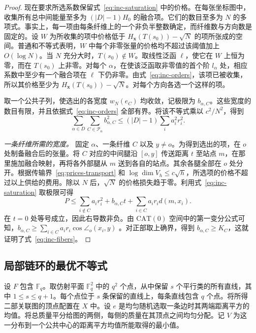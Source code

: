 \begin{proof}
现在要求所选系数保留式~\eqref{eq:inc-saturation} 中的价格。在每张坐标图中，收集所有总中间能量至多为 $(|D|-1)H_0$ 的融合项。它们的数目至多为 $N$ 的多项式。事实上，每一项由每条纤维上的一个非负半整数确定，而纤维数与方向数是固定的。设 $W$ 为所收集的项中价格低于 $H_{\mathbf x}(T(s_0))-\sqrt N$ 的项所张成的空间。普通和不等式表明，$W$ 中每个非零张量的价格均不超过该阈值加上 $O(\log N)$。当 $N$ 充分大时，$T(s_0)\notin W$。取线性泛函 $\ell$，使它在 $W$ 上恒为零，而在 $T(s_0)$ 上非零。对每个 $\alpha$，在使该泛函取非零值的首个阶 $l_\alpha$ 处，相应系数中至少有一个融合项在 $\ell$ 下仍非零。由式~\eqref{eq:inc-orders}，该项已被收集，所以其价格至少为 $H_{\mathbf x}(T(s_0))-\sqrt N$。对每个方向各选一个这样的项。

取一个公共子列，使选出的各宽度 $w_N(e_C)$ 均收敛，记极限为 $b_{\alpha,C}$。这些宽度的数目有限，并且依据式~\eqref{eq:inc-orders} 全部有界。将该不等式乘以 $c^2/N^2$，得到
\[
 \sum_{\alpha\in D}\sum_{C\in\mathcal P_\alpha}b_{\alpha,C}^2
                  \le (|D|-1)\sum_i a_i^2 r_i^2 .
\]

\emph{一条纤维所需的宽度。}
固定 $\alpha$、一条纤维 $C$ 以及 $y\ne o$。为得到选出的项，在 $o$ 处制备融合后的张量。将 $C$ 对应的中间腿沿 $[o,y]$ 传送距离 $t$ 至站点 $m$，在那里施加融合映射，再将各外部腿从 $m$ 送到各自的站点。其余各腿全部在 $o$ 处分开。根据传输界~\eqref{eq:prices-transport} 和 $\log\dim V_h\le c\sqrt h$，所选项的价格不超过以上供给的费用。除以 $N$ 后，$\sqrt N$ 的价格损失趋于零。利用式~\eqref{eq:inc-saturation} 取极限可得
\[
 P\le\sum_{i\notin C}a_i r_i^2+b_{\alpha,C}t+
                       \sum_{i\in C}a_i r_i d(m,x_i).
\]
在 $t=0$ 处等号成立，因此右导数非负。由 $\mathrm{CAT}(0)$ 空间中的第一变分公式可知，$b_{\alpha,C}\ge\sum_{i\in C}a_i r_i\cos\angle_o(x_i,y)$ \cite[第~II.3~章]{BridsonHaefliger}。对正部取上确界，得到 $b_{\alpha,C}\ge K_C$，这就证明了式~\eqref{eq:inc-fibers}。
\end{proof}

\subsection{局部链环的最优不等式}

设 $F$ 包含 $\mathbb F_q$。取仿射平面 $\mathbb F_q^2$ 中的 $q^2$ 个点，从中保留 $s$ 个平行类的所有直线，其中 $1\le s\le q+1$。每个点位于 $s$ 条保留的直线上，每条直线包含 $q$ 个点。将所得二部关联图的顶点配置在 $X$ 中。设 $e$ 是均匀随机选取一条边时其两端距离平方的均值。将总质量平分给图的两侧，每侧的质量在其顶点之间均匀分配。记 $V$ 为这一分布到一个公共中心的距离平方均值所能取得的最小值。

